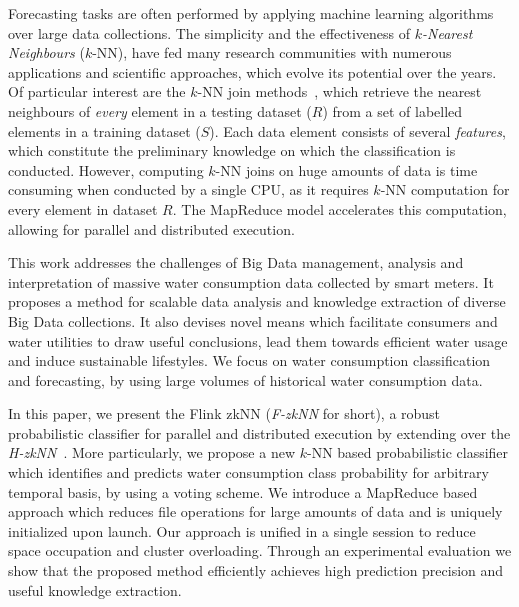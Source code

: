 Forecasting tasks are often performed by applying machine learning algorithms over large data collections. The simplicity and the effectiveness of \textit{$k$-Nearest Neighbours} ($k$-NN), have fed many research communities with numerous applications and scientific approaches, which evolve its potential over the years. Of particular interest are the $k$-NN join methods~\cite{bohm2004knn}, which retrieve the nearest neighbours of \textit{every} element in a testing dataset ($R$) from a set of labelled elements in a training dataset ($S$). Each data element consists of several \textit{features}, which constitute the preliminary knowledge on which the classification is conducted. However, computing $k$-NN joins on huge amounts of data is time consuming when conducted by a single CPU, as it requires $k$-NN computation for every element in dataset $R$. The MapReduce model accelerates this computation, allowing for parallel and distributed execution. 

This work addresses the challenges of Big Data management, analysis and interpretation of massive water consumption data collected by smart meters. It proposes a method for scalable data analysis and knowledge extraction of diverse Big Data collections. It also devises novel means which facilitate consumers and water utilities to draw useful conclusions, lead them towards efficient water usage and induce sustainable lifestyles. We focus on water consumption classification and forecasting, by using large volumes of historical water consumption data.

In this paper, we present the Flink zkNN (\textit{F-zkNN} for short), a robust probabilistic classifier for parallel and distributed execution by extending over the \textit{H-zkNN}~\cite{zhang2012epk}. More particularly, we propose a new $k$-NN based probabilistic classifier which identifies and predicts water consumption class probability for arbitrary temporal basis, by using a voting scheme. We introduce a MapReduce based approach which reduces file operations for large amounts of data and is uniquely initialized upon launch. Our approach is unified in a single session to reduce space occupation and cluster overloading. Through an experimental evaluation we show that the proposed method efficiently achieves high prediction precision and useful knowledge extraction.